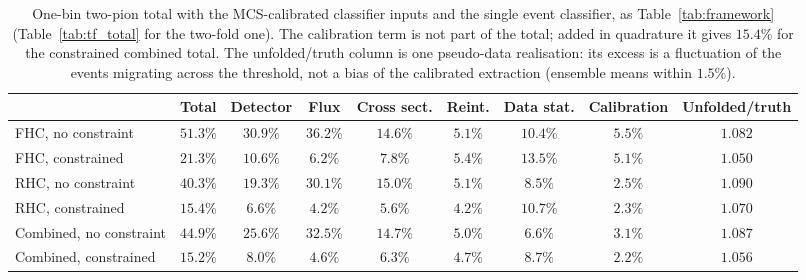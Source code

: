 \documentclass[11pt,a4paper]{article}
\begin{document}
\begin{table}[H]
  \centering
  \caption{One-bin two-pion total with the MCS-calibrated classifier inputs and the single event classifier, as
    Table~\ref{tab:framework} (Table~\ref{tab:tf_total} for the two-fold one).
    The calibration term is not part of the total; added in quadrature it gives $15.4\%$ for the constrained
    combined total. The unfolded/truth column is one pseudo-data realisation: its excess is a fluctuation of the
    events migrating across the threshold, not a bias of the calibrated extraction (ensemble means within $1.5\%$).}
  \label{tab:mcscal}
  \footnotesize\setlength{\tabcolsep}{3pt}
  \begin{tabular}{lcccccccc}
    \toprule
    & Total & Detector & Flux & Cross sect. & Reint. & Data stat. & Calibration & Unfolded/truth \\
    \midrule
    FHC, no constraint       & $51.3\%$ & $30.9\%$ & $36.2\%$ & $14.6\%$ & $5.1\%$ & $10.4\%$ & $5.5\%$ & $1.082$ \\
    FHC, constrained         & $21.3\%$ & $10.6\%$ & $6.2\%$  & $7.8\%$  & $5.4\%$ & $13.5\%$ & $5.1\%$ & $1.050$ \\
    RHC, no constraint       & $40.3\%$ & $19.3\%$ & $30.1\%$ & $15.0\%$ & $5.1\%$ & $8.5\%$  & $2.5\%$ & $1.090$ \\
    RHC, constrained         & $15.4\%$ & $6.6\%$  & $4.2\%$  & $5.6\%$  & $4.2\%$ & $10.7\%$ & $2.3\%$ & $1.070$ \\
    Combined, no constraint  & $44.9\%$ & $25.6\%$ & $32.5\%$ & $14.7\%$ & $5.0\%$ & $6.6\%$  & $3.1\%$ & $1.087$ \\
    Combined, constrained    & $15.2\%$ & $8.0\%$  & $4.6\%$  & $6.3\%$  & $4.7\%$ & $8.7\%$  & $2.2\%$ & $1.056$ \\
    \bottomrule
  \end{tabular}
\end{table}
\end{document}
